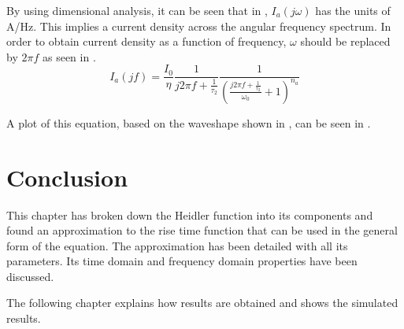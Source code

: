 By using dimensional analysis, it can be seen that in , $I_a(j\omega)$ has the units of A/Hz. This implies a current density across the angular frequency spectrum. In order to obtain current density as a function of frequency, $\omega$ should be replaced by $2 \pi f$ as seen in .
\begin{equation}
    I_a \left( jf \right) = \frac{I_0}{\eta}\frac{1}{j2\pi f + \frac{1}{\tau_2}}\frac{1}{\left ( \frac{j2\pi f + \frac{1}{\tau_2}}{\omega_0} + 1 \right )^{n_a}}
    \label{eqn:approx_fourier_freq}
\end{equation}

A plot of this equation, based on the waveshape shown in , can be seen in .

\section{Conclusion}
\label{sec:approx_conclusion}
This chapter has broken down the Heidler function into its components and found an approximation to the rise time function that can be used in the general form of the equation. The approximation has been detailed with all its parameters. Its time domain and frequency domain properties have been discussed.

The following chapter explains how results are obtained and shows the simulated results.
